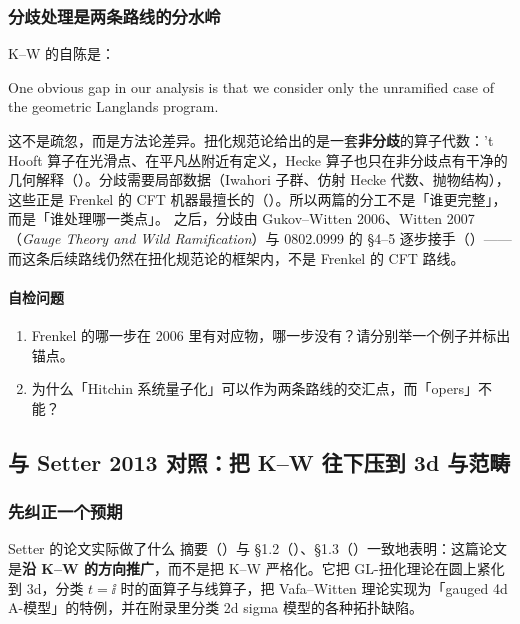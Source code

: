 \subsubsection*{分歧处理是两条路线的分水岭}

K--W 的自陈是：\pA
\begin{origquote}
One obvious gap in our analysis is that we consider only the unramified case of the geometric Langlands program. 
\end{origquote}
这不是疏忽，而是方法论差异。扭化规范论给出的是一套\textbf{非分歧}的算子代数：'t Hooft 算子在光滑点、在平凡丛附近有定义，Hecke 算子也只在非分歧点有干净的几何解释（）。\pA 分歧需要局部数据（Iwahori 子群、仿射 Hecke 代数、抛物结构），这些正是 Frenkel 的 CFT 机器最擅长的（）。\pA 所以两篇的分工不是「谁更完整」，而是「谁处理哪一类点」。 之后，分歧由 Gukov--Witten 2006、Witten 2007（\emph{Gauge Theory and Wild Ramification}）与 0802.0999 的 \S4--5 逐步接手（）——而这条后续路线仍然在扭化规范论的框架内，不是 Frenkel 的 CFT 路线。\pA

\paragraph{自检问题}
\begin{enumerate}
\item Frenkel 的哪一步在 2006 里有对应物，哪一步没有？请分别举一个例子并标出锚点。\pC
\item 为什么「Hitchin 系统量子化」可以作为两条路线的交汇点，而「opers」不能？\pC
\end{enumerate}

\subsection{与 Setter 2013 对照：把 K--W 往下压到 3d 与范畴}
\label{sec:compare-setter}

\subsubsection*{先纠正一个预期}

\begin{kcard}{Setter 的论文实际做了什么}
摘要（）与 \S1.2（）、\S1.3（）一致地表明：这篇论文是\textbf{沿 K--W 的方向推广}，而不是把 K--W 严格化。它把 GL-扭化理论在圆上紧化到 3d，分类 $t=\ii$ 时的面算子与线算子，把 Vafa--Witten 理论实现为「gauged 4d A-模型」的特例，并在附录里分类 2d sigma 模型的各种拓扑缺陷。
\end{kcard}

